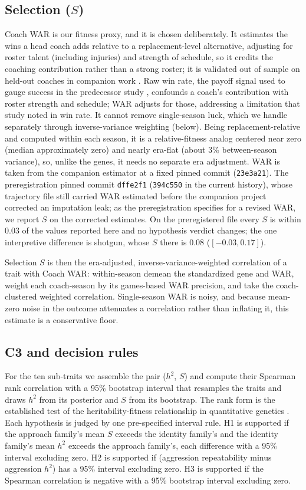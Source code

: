 \documentclass[
  journal=ehs,
  manuscript=article,
  year=2026,
  volume=8,
]{cup-journal}
\begin{document}
\subsection{Selection ($S$)}
Coach WAR is our fitness proxy, and it is chosen deliberately. It estimates the wins
a head coach adds relative to a replacement-level alternative, adjusting for roster
talent (including injuries) and strength of schedule, so it credits the coaching
contribution rather than a strong roster; it is validated out of sample on held-out
coaches in companion work \parencite{williamson2026war}. Raw win rate, the payoff
signal used to gauge success in the predecessor study \parencite{mesoudi2020},
confounds a coach's contribution with roster strength and schedule; WAR adjusts for
those, addressing a limitation that study noted in win rate. It cannot remove
single-season luck, which we handle separately through inverse-variance weighting
(below). Being replacement-relative and computed within each season, it is a
relative-fitness analog centered near zero (median approximately zero) and nearly
era-flat (about 3\% between-season variance), so, unlike the genes, it needs no
separate era adjustment. WAR is taken from the companion estimator at a fixed pinned
commit (\texttt{23e3a21}). The preregistration pinned commit \texttt{dffe2f1}
(\texttt{394c550} in the current history), whose
trajectory file still carried WAR estimated before the companion project corrected an
imputation leak; as the preregistration specifies for a revised WAR, we report $S$ on
the corrected estimates. On the preregistered file every $S$ is within 0.03 of the
values reported here and no hypothesis verdict changes; the one interpretive
difference is shotgun, whose $S$ there is $0.08$ ($[-0.03,0.17]$).

Selection $S$ is then the era-adjusted, inverse-variance-weighted correlation of a
trait with Coach WAR: within-season demean the standardized gene and WAR, weight each
coach-season by its games-based WAR precision, and take the coach-clustered weighted
correlation. Single-season WAR is noisy, and because mean-zero noise in the outcome
attenuates a correlation rather than inflating it, this estimate is a conservative
floor.

\subsection{C3 and decision rules}
For the ten sub-traits we assemble the pair ($h^{2}$, $S$) and compute their
Spearman rank correlation with a 95\% bootstrap interval that resamples the traits
and draws $h^{2}$ from its posterior and $S$ from its bootstrap. The rank form is
the established test of the heritability-fitness relationship in quantitative
genetics \parencite{mousseauroff1987, kruuk2000}. Each hypothesis is judged by one
pre-specified interval rule. H1 is supported if the approach family's mean $S$
exceeds the identity family's and the identity family's mean $h^{2}$ exceeds the
approach family's, each difference with a 95\% interval excluding zero. H2 is
supported if (aggression repeatability minus aggression $h^{2}$) has a 95\%
interval excluding zero. H3 is supported if the Spearman correlation is negative
with a 95\% bootstrap interval excluding zero.
\end{document}
